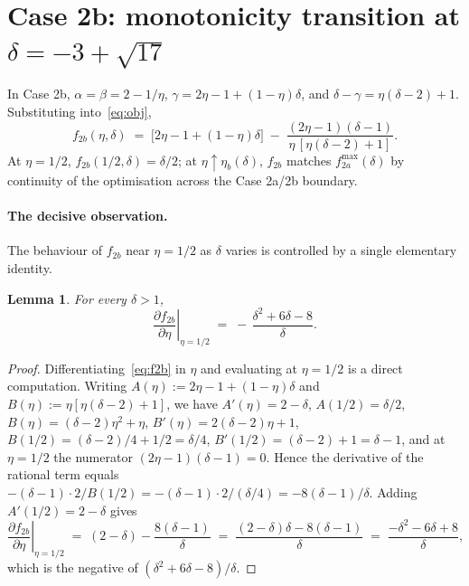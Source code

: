 \documentclass[11pt,a4paper]{article}
\newtheorem{lemma}[theorem]{Lemma}
\theoremstyle{definition}
\begin{document}
\section{Case 2b: monotonicity transition at $\delta = -3 + \sqrt{17}$}
\label{sec:case2b}

In Case 2b, $\alpha = \beta = 2 - 1/\eta$, $\gamma = 2\eta - 1 +
(1 - \eta) \delta$, and $\delta - \gamma = \eta(\delta - 2) + 1$.
Substituting into~\eqref{eq:obj},
\begin{equation}\label{eq:f2b}
  f_{2b}(\eta, \delta) \;=\;
    \bigl[2\eta - 1 + (1 - \eta) \delta\bigr]
    \;-\; \frac{(2\eta - 1)(\delta - 1)}{\eta\,[\eta(\delta - 2) + 1]}.
\end{equation}
At $\eta = 1/2$, $f_{2b}(1/2, \delta) = \delta/2$; at
$\eta \uparrow \eta_b(\delta)$, $f_{2b}$ matches $f_{2a}^{\max}(\delta)$
by continuity of the optimisation across the Case 2a/2b boundary.

\paragraph{The decisive observation.}
The behaviour of $f_{2b}$ near $\eta = 1/2$ as $\delta$ varies is
controlled by a single elementary identity.

\begin{lemma}\label{lem:case2b-deriv}
For every $\delta > 1$,
\begin{equation}\label{eq:case2b-deriv}
  \left.\frac{\partial f_{2b}}{\partial \eta}\right|_{\eta = 1/2}
  \;=\; -\,\frac{\delta^2 + 6\delta - 8}{\delta}.
\end{equation}
\end{lemma}

\begin{proof}
Differentiating~\eqref{eq:f2b} in $\eta$ and evaluating at $\eta = 1/2$
is a direct computation. Writing $A(\eta) := 2\eta - 1 + (1 - \eta)\delta$
and $B(\eta) := \eta[\eta(\delta - 2) + 1]$, we have
$A'(\eta) = 2 - \delta$, $A(1/2) = \delta/2$,
$B(\eta) = (\delta - 2)\eta^2 + \eta$, $B'(\eta) = 2(\delta - 2)\eta + 1$,
$B(1/2) = (\delta - 2)/4 + 1/2 = \delta/4$,
$B'(1/2) = (\delta - 2) + 1 = \delta - 1$,
and at $\eta = 1/2$ the numerator $(2\eta - 1)(\delta - 1) = 0$. Hence
the derivative of the rational term equals $-(\delta - 1) \cdot 2 / B(1/2)
= -(\delta - 1) \cdot 2 / (\delta/4) = -8(\delta - 1)/\delta$.
Adding $A'(1/2) = 2 - \delta$ gives
\[
  \left.\frac{\partial f_{2b}}{\partial \eta}\right|_{\eta = 1/2}
  \;=\; (2 - \delta) - \frac{8(\delta - 1)}{\delta}
  \;=\; \frac{(2 - \delta)\delta - 8(\delta - 1)}{\delta}
  \;=\; \frac{-\delta^2 - 6\delta + 8}{\delta},
\]
which is the negative of $(\delta^2 + 6\delta - 8)/\delta$.
\end{proof}
\end{document}
